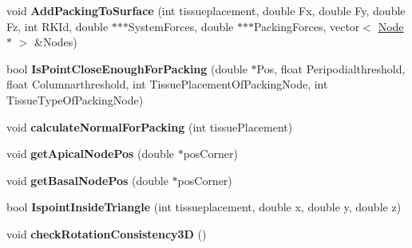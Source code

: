 \begin{DoxyCompactItemize}
\item 
\hypertarget{classPrism_a9bec5b2cd9c1bf5f7aa5e2dfb9c17ac8}{}void {\bfseries Add\+Packing\+To\+Surface} (int tissueplacement, double Fx, double Fy, double Fz, int R\+K\+Id, double $\ast$$\ast$$\ast$System\+Forces, double $\ast$$\ast$$\ast$Packing\+Forces, vector$<$ \hyperlink{classNode}{Node} $\ast$ $>$ \&Nodes)\label{classPrism_a9bec5b2cd9c1bf5f7aa5e2dfb9c17ac8}

\item 
\hypertarget{classPrism_a523002e7e6487db1a4506b2f0b2b4e04}{}bool {\bfseries Is\+Point\+Close\+Enough\+For\+Packing} (double $\ast$Pos, float Peripodialthreshold, float Columnarthreshold, int Tissue\+Placement\+Of\+Packing\+Node, int Tissue\+Type\+Of\+Packing\+Node)\label{classPrism_a523002e7e6487db1a4506b2f0b2b4e04}

\item 
\hypertarget{classPrism_adaa9ffb371d07e063e1b280d959a9fe6}{}void {\bfseries calculate\+Normal\+For\+Packing} (int tissue\+Placement)\label{classPrism_adaa9ffb371d07e063e1b280d959a9fe6}

\item 
\hypertarget{classPrism_a243934a73a8f198ed592761ecb0927b9}{}void {\bfseries get\+Apical\+Node\+Pos} (double $\ast$pos\+Corner)\label{classPrism_a243934a73a8f198ed592761ecb0927b9}

\item 
\hypertarget{classPrism_a31324d23b37fa20911916ebb7ee1064d}{}void {\bfseries get\+Basal\+Node\+Pos} (double $\ast$pos\+Corner)\label{classPrism_a31324d23b37fa20911916ebb7ee1064d}

\item 
\hypertarget{classPrism_a26bb1eed04307a373ba87b48f1c1a3ca}{}bool {\bfseries Ispoint\+Inside\+Triangle} (int tissueplacement, double x, double y, double z)\label{classPrism_a26bb1eed04307a373ba87b48f1c1a3ca}

\item 
\hypertarget{classPrism_a85f9b472a3310e76ab0c76bd1fb7dd30}{}void {\bfseries check\+Rotation\+Consistency3\+D} ()\label{classPrism_a85f9b472a3310e76ab0c76bd1fb7dd30}

\end{DoxyCompactItemize}
